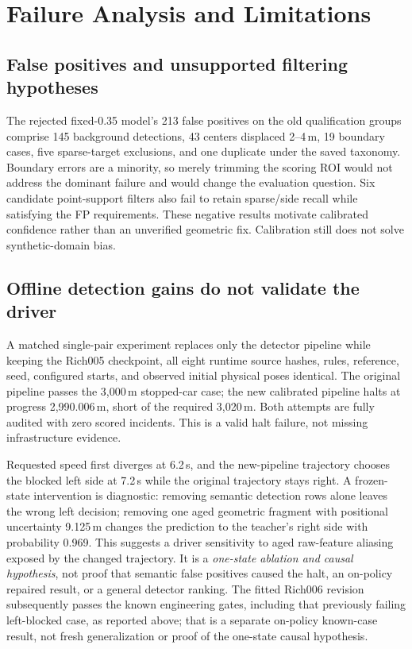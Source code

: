\documentclass[conference]{IEEEtran}
\begin{document}
\section{Failure Analysis and Limitations}
\subsection{False positives and unsupported filtering hypotheses}
The rejected fixed-0.35 model's 213 false positives on the old qualification groups comprise 145 background detections, 43 centers displaced 2--4\,m, 19 boundary cases, five sparse-target exclusions, and one duplicate under the saved taxonomy. Boundary errors are a minority, so merely trimming the scoring ROI would not address the dominant failure and would change the evaluation question. Six candidate point-support filters also fail to retain sparse/side recall while satisfying the FP requirements. These negative results motivate calibrated confidence rather than an unverified geometric fix. Calibration still does not solve synthetic-domain bias.


\subsection{Offline detection gains do not validate the driver}
A matched single-pair experiment replaces only the detector pipeline while keeping the Rich005 checkpoint, all eight runtime source hashes, rules, reference, seed, configured starts, and observed initial physical poses identical. The original pipeline passes the 3,000\,m stopped-car case; the new calibrated pipeline halts at progress 2,990.006\,m, short of the required 3,020\,m. Both attempts are fully audited with zero scored incidents. This is a valid halt failure, not missing infrastructure evidence.

Requested speed first diverges at 6.2\,s, and the new-pipeline trajectory chooses the blocked left side at 7.2\,s while the original trajectory stays right. A frozen-state intervention is diagnostic: removing semantic detection rows alone leaves the wrong left decision; removing one aged geometric fragment with positional uncertainty 9.125\,m changes the prediction to the teacher's right side with probability 0.969. This suggests a driver sensitivity to aged raw-feature aliasing exposed by the changed trajectory. It is a \emph{one-state ablation and causal hypothesis}, not proof that semantic false positives caused the halt, an on-policy repaired result, or a general detector ranking. The fitted Rich006 revision subsequently passes the known engineering gates, including that previously failing left-blocked case, as reported above; that is a separate on-policy known-case result, not fresh generalization or proof of the one-state causal hypothesis.
\end{document}
